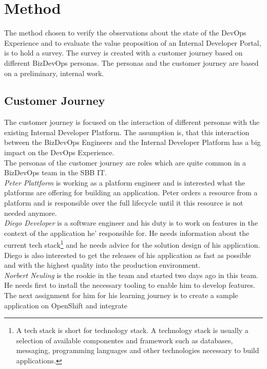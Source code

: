 \documentclass[a4paper,12pt]{article}
\begin{document}
    \section{Method}
    \label{sec:method}
    The method chosen to verify the observations about the state of the DevOps Experience and to evaluate the value proposition
    of an Internal Developer Portal, is to hold a survey.
    The survey is created with a customer journey based on different BizDevOps personas.
    The personas and the customer journey are based on a preliminary, internal work\parencite{sbbjobstobedone}.

    \subsection{Customer Journey}
    \label{subsec:cusjour}
    The customer journey is focused on the interaction of different personas with the existing Internal Developer Platform.
    The assumption is, that this interaction between the BizDevOps Engineers and the Internal Developer Platform has a big
    impact on the DevOps Experience.\\
    The personas of the customer journey are roles which are quite common in a BizDevOps team in the SBB IT.\\
    \textit{Peter Plattform} is working as a platform engineer and is interested what the platforms are offering for building
    an application.
    Peter orders a resource from a platform and is responsible over the full lifecycle until it this resource is not
    needed anymore.\\
    \textit{Diego Developer} is a software engineer and his duty is to work on features in the context of the application
    he' responsible for.
    He needs information about the current tech stack\footnote{A tech stack is short for technology stack.
    A technology stack is usually a selection of available componentes and framework such as databases, messaging, programming
    languages and other technologies necessary to build applications.} and he needs advice for the solution design of his application.
    Diego is also interested to get the releases of his application as fast as possible and with the highest quality
    into the production environment.\\
    \textit{Norbert Neuling} is the rookie in the team and started two days ago in this team.
    He needs first to install the necessary tooling to enable him to develop features.
    The next assignment for him for his learning journey is to create a sample application on OpenShift and integrate
\end{document}
